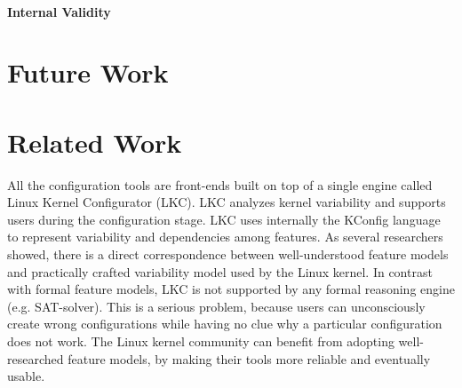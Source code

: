 \documentclass{chi2009}
\newcommand{\todo}[1]{\textsf{\textbf{\textcolor{Orange}{[[#1]]}}}}
\begin{document}
\paragraph{Internal Validity}

\section{Future Work}\label{sec:futurework}



\section{Related Work}\label{sec:relatedwork}

All the configuration tools are front-ends built on top of a single engine called Linux Kernel Configurator (LKC). LKC analyzes kernel variability and supports users during the configuration stage. LKC uses internally the KConfig language to represent variability and dependencies among features. As several researchers \cite{sincero:lkc:2008,she:kernel:2010} showed, there is a direct correspondence between well-understood feature models and practically crafted variability model used by the Linux kernel. In contrast with formal feature models, LKC is not supported by any formal reasoning engine (e.g. SAT-solver). This is a serious problem, because users can unconsciously create wrong configurations while having no clue why a particular configuration does not work. The Linux kernel community can benefit from adopting well-researched feature models, by making their tools more reliable and eventually usable.
\end{document}
